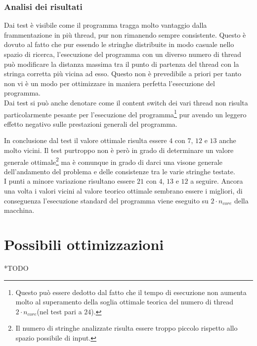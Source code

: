 \documentclass{article}
\begin{document}
   \subsubsection{Analisi dei risultati}
   Dai test è visibile come il programma tragga molto vantaggio dalla frammentazione in più thread, pur non rimanendo sempre consistente. Questo è dovuto al fatto che pur essendo le stringhe distribuite in modo casuale nello spazio di ricerca, l'esecuzione del programma con un diverso numero di thread può modificare la distanza massima tra il punto di partenza del thread con la stringa corretta più vicina ad esso. Questo non è prevedibile a priori per tanto non vi è un modo per ottimizzare in maniera perfetta l'esecuzione del programma.\\

   Dai test si può anche denotare come il content switch dei vari thread non risulta particolarmente pesante per l'esecuzione del programma\footnote{Questo può essere dedotto dal fatto che il tempo di esecuzione non aumenta molto al superamento della soglia ottimale teorica del numero di thread $2 \cdot n_{core}$(nel test pari a $24$).} pur avendo un leggero effetto negativo sulle prestazioni generali del programma.
   \newpage %

   In conclusione dal test il valore ottimale risulta essere $4$ con $7$, $12$ e $13$ anche molto vicini. Il test purtroppo non è però in grado di determinare un valore generale ottimale\footnote{Il numero di stringhe analizzate risulta essere troppo piccolo rispetto allo spazio possibile di input.} ma è comunque in grado di darci una visone generale dell'andamento del problema e delle consistenze tra le varie stringhe testate.\\
   
   I punti a minore variazione risultano essere $21$ con $4$, $13$ e $12$ a seguire. Ancora una volta i valori vicini al valore teorico ottimale sembrano essere i migliori, di conseguenza l'esecuzione standard del programma viene eseguito su $2 \cdot n_{core}$ della macchina.

   \section{Possibili ottimizzazioni}
   *TODO
     
\end{document}
